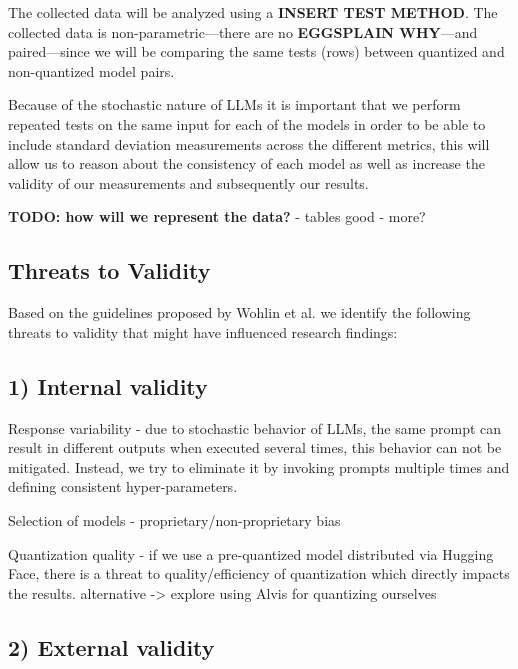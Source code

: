 \documentclass[conference]{IEEEtran}
\begin{document}
The collected data will be analyzed using a \textbf{INSERT TEST METHOD}. The collected data is non-parametric---there are no \textbf{EGGSPLAIN WHY}---and paired---since we will be comparing the same tests (rows) between quantized and non-quantized model pairs.

Because of the stochastic nature of LLMs it is important that we perform repeated tests on the same input for each of the models in order to be able to include standard deviation measurements across the different metrics, this will allow us to reason about the consistency of each model as well as increase the validity of our measurements and subsequently our results.

\textbf{TODO: how will we represent the data?}
- tables good
- more?


\subsection{Threats to Validity}

Based on the guidelines proposed by Wohlin et al. \cite{wohlin2012experimentation} we identify the following threats to validity that might have influenced research findings: 
\subsection*{\textbf{1) Internal validity}}
    Response variability - due to stochastic behavior of LLMs, the same prompt can result in different outputs when executed several times, this behavior can not be mitigated. Instead, we try to eliminate it by invoking prompts multiple times and defining consistent hyper-parameters.
    
    Selection of models - proprietary/non-proprietary bias
    
    Quantization quality - if we use a pre-quantized model distributed via Hugging Face, there is a threat to quality/efficiency of quantization which directly impacts the results. alternative -> explore using Alvis for quantizing ourselves 

\subsection*{\textbf{2) External validity}}
    
\end{document}
